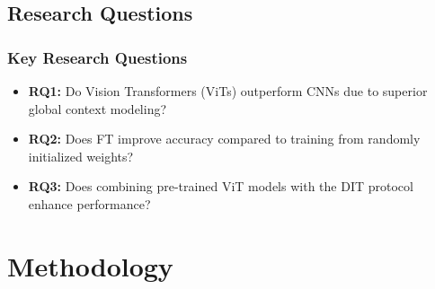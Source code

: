 \documentclass{beamer}
\begin{document}
\subsection{Research Questions}


\begin{frame}
  \frametitle{Key Research Questions}
  \begin{itemize}
    \itemsep 1em
    \item \textbf{RQ1:} Do Vision Transformers (ViTs) outperform CNNs due to superior global context modeling?
    \pause
    \item \textbf{RQ2:} Does \ac{FT} improve accuracy compared to training from randomly initialized weights?
    \pause
    \item \textbf{RQ3:} Does combining pre-trained \ac{ViT} models
      with the \ac{DIT} protocol enhance performance?
  \end{itemize}
\end{frame}

\section{Methodology}
\end{document}
